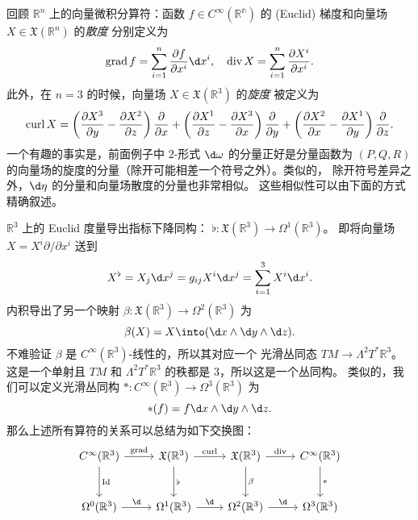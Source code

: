 回顾 $\mathbb{R}^n$ 上的向量微积分算符：函数 $f\in C^\infty(\mathbb{R^n})$
的 (Euclid) 梯度和向量场 $X\in \mathfrak{X}(\mathbb{R}^n)$ 的\emph{散度}
分别定义为
\begin{equation}
  \grad f=\sum_{i=1}^n\frac{\partial f}{\partial x^i}\d x^i,\quad 
  \dive X=\sum_{i=1}^n\frac{\partial X^i}{\partial x^i}.
\end{equation}
此外，在 $n=3$ 的时候，向量场 $X\in \mathfrak{X}(\mathbb{R}^3)$ 的\emph{旋度}
被定义为
\[
  \operatorname{curl} X=\left(\frac{\partial X^3}{\partial y}-\frac{\partial X^2}{\partial z}\right)
  \frac{\partial}{\partial x}+  \left(\frac{\partial X^1}{\partial z}-\frac{\partial X^3}{\partial x}\right)
  \frac{\partial}{\partial y}+
  \left(\frac{\partial X^2}{\partial x}-\frac{\partial X^1}{\partial y}\right)
  \frac{\partial}{\partial z}.
\]
一个有趣的事实是，前面例子中 $2$-形式 $\d\omega$ 的分量正好是分量函数为
$(P,Q,R)$ 的向量场的旋度的分量（除开可能相差一个符号之外）。类似的，
除开符号差异之外，$\d\eta$ 的分量和向量场散度的分量也非常相似。
这些相似性可以由下面的方式精确叙述。

$\mathbb{R}^3$ 上的 Euclid 度量导出指标下降同构：
$\flat:\mathfrak{X}(\mathbb{R}^3)\to \Omega^1(\mathbb{R}^3)$。
即将向量场 $X=X^i\partial/\partial x^i$ 送到
\[
  X^\flat=X_j\d x^j=g_{ij}X^i\d x^j=\sum_{i=1}^3 X^i\d x^i.
\]
内积导出了另一个映射 $\beta:\mathfrak{X}(\mathbb{R}^3)\to \Omega^2(\mathbb{R}^3)$
为
\begin{equation}
  \beta(X)=X\into (\d x\wedge\d y\wedge \d z).
\end{equation}
不难验证 $\beta$ 是 $C^\infty(\mathbb{R}^3)$-线性的，所以其对应一个
光滑丛同态 $TM\to \Lambda^2T^*\mathbb{R}^3$。这是一个单射且
$TM$ 和 $\Lambda^2T^*\mathbb{R}^3$ 的秩都是 $3$，所以这是一个丛同构。
类似的，我们可以定义光滑丛同构 $*:C^\infty(\mathbb{R}^3)\to \Omega^3(\mathbb{R}^3)$
为
\begin{equation}
  *(f)=f\d x\wedge\d y\wedge\d z.
\end{equation}
那么上述所有算符的关系可以总结为如下交换图：
\begin{equation}
  \begin{tikzcd}[row sep=large]
    C^\infty(\mathbb{R}^3)\arrow[r,"\grad"]\arrow[d,"\Id"]
    & \mathfrak{X}(\mathbb{R}^3)\arrow[r,"\curl"]\arrow[d,"\flat"]
    & \mathfrak{X}(\mathbb{R}^3)\arrow[r,"\dive"]\arrow[d,"\beta"]
    & C^\infty(\mathbb{R}^3)\arrow[d,"*"]
    \\
    \Omega^0(\mathbb{R}^3)\arrow[r,"\d"] & 
    \Omega^1(\mathbb{R}^3)\arrow[r,"\d"] & 
    \Omega^2(\mathbb{R}^3)\arrow[r,"\d"] & 
    \Omega^3(\mathbb{R}^3)
  \end{tikzcd}
\end{equation}

